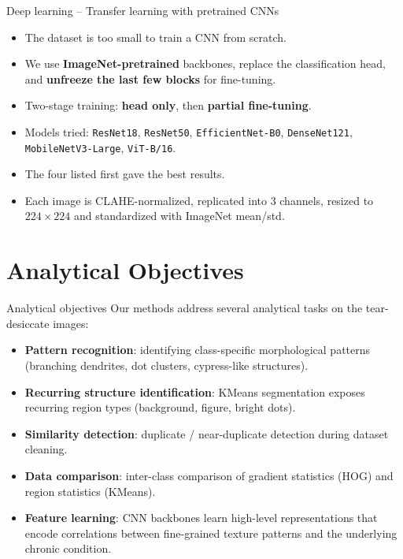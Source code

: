 \documentclass[aspectratio=169]{beamer}
\begin{document}
\begin{frame}{Deep learning -- Transfer learning with pretrained CNNs}
    \begin{itemize}
        \item The dataset is too small to train a CNN from scratch.
        \item We use \textbf{ImageNet-pretrained} backbones, replace the classification head,
              and \textbf{unfreeze the last few blocks} for fine-tuning.
        \item Two-stage training: \textbf{head only}, then \textbf{partial fine-tuning}.
        \item Models tried: \texttt{ResNet18}, \texttt{ResNet50}, \texttt{EfficientNet-B0},
              \texttt{DenseNet121}, \texttt{MobileNetV3-Large}, \texttt{ViT-B/16}.
        \item The four listed first gave the best results.
        \item Each image is CLAHE-normalized, replicated into 3 channels,
              resized to $224{\times}224$ and standardized with ImageNet mean/std.
    \end{itemize}
\end{frame}

\section{Analytical Objectives}

\begin{frame}{Analytical objectives}
    Our methods address several analytical tasks on the tear-desiccate images:
    \begin{itemize}
        \item \textbf{Pattern recognition}: identifying class-specific morphological
              patterns (branching dendrites, dot clusters, cypress-like structures).
        \item \textbf{Recurring structure identification}: KMeans segmentation
              exposes recurring region types (background, figure, bright dots).
        \item \textbf{Similarity detection}: duplicate / near-duplicate detection
              during dataset cleaning.
        \item \textbf{Data comparison}: inter-class comparison of gradient
              statistics (HOG) and region statistics (KMeans).
        \item \textbf{Feature learning}: CNN backbones learn high-level
              representations that encode correlations between fine-grained
              texture patterns and the underlying chronic condition.
    \end{itemize}
\end{frame}
\end{document}

